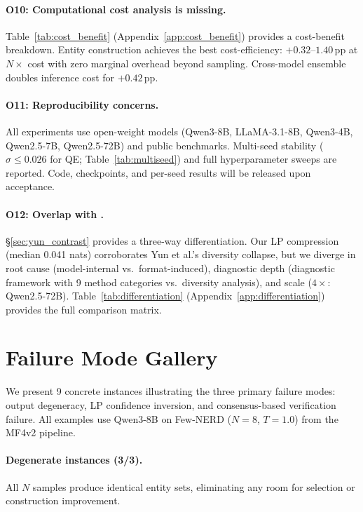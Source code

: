 \paragraph{O10: Computational cost analysis is missing.}
Table~\ref{tab:cost_benefit} (Appendix~\ref{app:cost_benefit}) provides a cost-benefit breakdown. Entity construction achieves the best cost-efficiency: $+0.32$--$1.40$\,pp at $N{\times}$ cost with zero marginal overhead beyond sampling. Cross-model ensemble doubles inference cost for $+0.42$\,pp.

\paragraph{O11: Reproducibility concerns.}
All experiments use open-weight models (Qwen3-8B, LLaMA-3.1-8B, Qwen3-4B, Qwen2.5-7B, Qwen2.5-72B) and public benchmarks. Multi-seed stability ($\sigma{\leq}0.026$ for QE; Table~\ref{tab:multiseed}) and full hyperparameter sweeps are reported. Code, checkpoints, and per-seed results will be released upon acceptance.

\paragraph{O12: Overlap with \citet{yun2025price}.}
\S\ref{sec:yun_contrast} provides a three-way differentiation. Our LP compression (median 0.041 nats) corroborates Yun et al.'s diversity collapse, but we diverge in root cause (model-internal vs.\ format-induced), diagnostic depth (diagnostic framework with 9 method categories vs.\ diversity analysis), and scale ($4{\times}$: Qwen2.5-72B). Table~\ref{tab:differentiation} (Appendix~\ref{app:differentiation}) provides the full comparison matrix.

\section{Failure Mode Gallery}\label{app:failure_gallery}

We present 9 concrete instances illustrating the three primary failure modes: output degeneracy, LP confidence inversion, and consensus-based verification failure. All examples use Qwen3-8B on Few-NERD ($N{=}8$, $T{=}1.0$) from the MF4v2 pipeline.

\paragraph{Degenerate instances (3/3).}
All $N$ samples produce identical entity sets, eliminating any room for selection or construction improvement.

